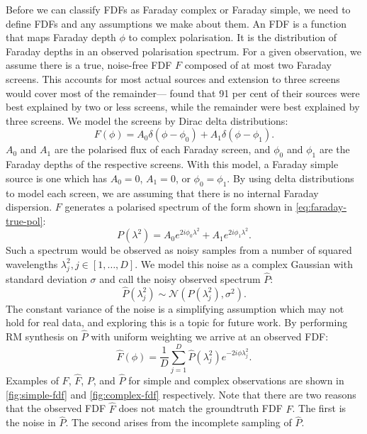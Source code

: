    Before we can classify FDFs as Faraday complex or Faraday simple, we need to define FDFs and any assumptions we make about them. An FDF is a function that maps Faraday depth $\phi$ to complex polarisation. It is the distribution of Faraday depths in an observed polarisation spectrum. For a given observation, we assume there is a true, noise-free FDF $F$ composed of at most two Faraday screens. This accounts for most actual sources \citep{anderson_broadband_2015} and extension to three screens would cover most of the remainder---\citet{osullivan_broad-band_2017} found that 91 per cent of their sources were best explained by two or less screens, while the remainder were best explained by three screens. We model the screens by Dirac delta distributions:
    \begin{equation}
        \label{eq:faraday-true-fdf}
        F(\phi) = A_0 \delta(\phi - \phi_0) + A_1 \delta(\phi - \phi_1).
    \end{equation}
    $A_0$ and $A_1$ are the polarised flux of each Faraday screen, and $\phi_0$ and $\phi_1$ are the Faraday depths of the respective screens. With this model, a Faraday simple source is one which has $A_0 = 0$, $A_1 = 0$, or $\phi_0 = \phi_1$. By using delta distributions to model each screen, we are assuming that there is no internal Faraday dispersion. $F$ generates a polarised spectrum of the form shown in \autoref{eq:faraday-true-pol}:
    \begin{equation}
        \label{eq:faraday-true-pol}
        P(\lambda^2) = A_0 e^{2i\phi_0\lambda^2} + A_1 e^{2i\phi_1\lambda^2}.
    \end{equation}
    Such a spectrum would be observed as noisy samples from a number of squared wavelengths $\lambda^2_j, j \in [1, \dots, D]$. We model this noise as a complex Gaussian with standard deviation $\sigma$ and call the noisy observed spectrum $\hat P$:
    \begin{equation}
      \label{eq:faraday-noisy-pol}
      \hat P(\lambda_j^2) \sim \mathcal N(P(\lambda^2_j), \sigma^2).
    \end{equation}
    The constant variance of the noise is a simplifying assumption which may not hold for real data, and exploring this is a topic for future work. By performing RM synthesis \citep{brentjens_faraday_2005} on $\hat P$ with uniform weighting we arrive at an observed FDF:
    \begin{equation}
      \label{eq:faraday-rm-synthesis}
      \hat F(\phi) = \frac{1}{D} \sum_{j = 1}^D \hat P(\lambda^2_j) e^{-2i\phi\lambda^2_j}.
    \end{equation}
    Examples of $F$, $\hat F$, $P$, and $\hat P$ for simple and complex observations are shown in \autoref{fig:simple-fdf} and \autoref{fig:complex-fdf} respectively. Note that there are two reasons that the observed FDF $\hat F$ does not match the groundtruth FDF $F$. The first is the noise in $\hat P$. The second arises from the incomplete sampling of $\hat P$.

